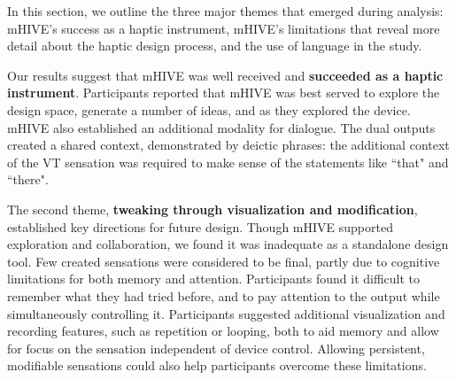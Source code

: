 
%
%
In this section, we outline the three major themes that emerged during analysis: %
%
 mHIVE's success as a haptic instrument, mHIVE's limitations that reveal more detail about the haptic design process, and the use of language in the study.


Our results suggest that mHIVE was well received and \textbf{succeeded as a haptic instrument}. %
Participants reported that mHIVE was best served to explore the design space, generate a number of ideas, and  as they explored the device.
mHIVE also
established an additional modality for dialogue.
The dual outputs created a shared context, demonstrated by deictic phrases: the additional context of the VT sensation was required to make sense of the statements like  ``that" and ``there".

The second theme, \textbf{tweaking through visualization and modification}, established
key directions for future design.
Though mHIVE supported exploration and collaboration, we found 
it was inadequate as a standalone design tool.
Few created sensations were considered to be final,
partly due to cognitive limitations for both memory and attention.
Participants found it difficult to remember what they had tried before, 
and to pay attention to the output 
while simultaneously controlling it. 
Participants suggested additional visualization and recording features, %
such as repetition or looping, both to aid memory and allow for focus on the sensation independent of device control. 
Allowing persistent, modifiable sensations %
could also help participants overcome these limitations.


